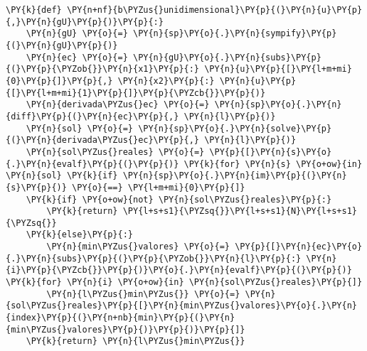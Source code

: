 \begin{itemize}
    \begin{tcolorbox}[breakable, size=fbox, boxrule=1pt, pad at break*=1mm,colback=cellbackground, colframe=cellborder]
\begin{Verbatim}[commandchars=\\\{\}]
\PY{k}{def} \PY{n+nf}{b\PYZus{}unidimensional}\PY{p}{(}\PY{n}{u}\PY{p}{,}\PY{n}{gU}\PY{p}{)}\PY{p}{:}
    \PY{n}{gU} \PY{o}{=} \PY{n}{sp}\PY{o}{.}\PY{n}{sympify}\PY{p}{(}\PY{n}{gU}\PY{p}{)}
    \PY{n}{ec} \PY{o}{=} \PY{n}{gU}\PY{o}{.}\PY{n}{subs}\PY{p}{(}\PY{p}{\PYZob{}}\PY{n}{x1}\PY{p}{:} \PY{n}{u}\PY{p}{[}\PY{l+m+mi}{0}\PY{p}{]}\PY{p}{,} \PY{n}{x2}\PY{p}{:} \PY{n}{u}\PY{p}{[}\PY{l+m+mi}{1}\PY{p}{]}\PY{p}{\PYZcb{}}\PY{p}{)}
    \PY{n}{derivada\PYZus{}ec} \PY{o}{=} \PY{n}{sp}\PY{o}{.}\PY{n}{diff}\PY{p}{(}\PY{n}{ec}\PY{p}{,} \PY{n}{l}\PY{p}{)}
    \PY{n}{sol} \PY{o}{=} \PY{n}{sp}\PY{o}{.}\PY{n}{solve}\PY{p}{(}\PY{n}{derivada\PYZus{}ec}\PY{p}{,} \PY{n}{l}\PY{p}{)}
    \PY{n}{sol\PYZus{}reales} \PY{o}{=} \PY{p}{[}\PY{n}{s}\PY{o}{.}\PY{n}{evalf}\PY{p}{(}\PY{p}{)} \PY{k}{for} \PY{n}{s} \PY{o+ow}{in} \PY{n}{sol} \PY{k}{if} \PY{n}{sp}\PY{o}{.}\PY{n}{im}\PY{p}{(}\PY{n}{s}\PY{p}{)} \PY{o}{==} \PY{l+m+mi}{0}\PY{p}{]}
    \PY{k}{if} \PY{o+ow}{not} \PY{n}{sol\PYZus{}reales}\PY{p}{:}
        \PY{k}{return} \PY{l+s+s1}{\PYZsq{}}\PY{l+s+s1}{N}\PY{l+s+s1}{\PYZsq{}}
    \PY{k}{else}\PY{p}{:}
        \PY{n}{min\PYZus{}valores} \PY{o}{=} \PY{p}{[}\PY{n}{ec}\PY{o}{.}\PY{n}{subs}\PY{p}{(}\PY{p}{\PYZob{}}\PY{n}{l}\PY{p}{:} \PY{n}{i}\PY{p}{\PYZcb{}}\PY{p}{)}\PY{o}{.}\PY{n}{evalf}\PY{p}{(}\PY{p}{)} \PY{k}{for} \PY{n}{i} \PY{o+ow}{in} \PY{n}{sol\PYZus{}reales}\PY{p}{]}
        \PY{n}{l\PYZus{}min\PYZus{}} \PY{o}{=} \PY{n}{sol\PYZus{}reales}\PY{p}{[}\PY{n}{min\PYZus{}valores}\PY{o}{.}\PY{n}{index}\PY{p}{(}\PY{n+nb}{min}\PY{p}{(}\PY{n}{min\PYZus{}valores}\PY{p}{)}\PY{p}{)}\PY{p}{]}
    \PY{k}{return} \PY{n}{l\PYZus{}min\PYZus{}}


\end{Verbatim}
\end{tcolorbox}
\end{itemize}
